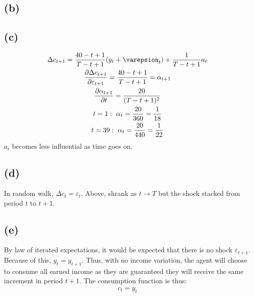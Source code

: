 \documentclass[10pt,a4paper]{article}
\begin{document}
    \subsection*{(b)}
    \subsection*{(c)}
      \begin{gather*}
        \Delta c_{t+1} = \frac{40-t+1}{T-t+1}(y_t+\varepsion_t) + \frac{1}{T-t+1}a_{t} \\
        \frac{\partial\Delta c_{t+1}}{\partial\varepsilon_{t+1}} = \frac{40-t+1}{T-t+1} = \alpha_{t+1} \\
        \frac{\partial\alpha_{t+1}}{\partial t} = \frac{20}{(T-t+1)^2} \\
        t = 1: \ \alpha_t = \frac{20}{360} = \frac{1}{18} \\
        t = 39: \ \alpha_t = \frac{20}{440} = \frac{1}{22} \\
      \end{gather*}
      $a_t$ becomes less influential as time goes on. 
    \subsection*{(d)}
      In random walk, $\Delta c_t = \varepsilon_t$. Above, \alpha shrank as $t \rightarrow T$ but the shock stacked from period $t$ to $t+1$.
    \subsection*{(e)}
      By law of iterated expectations, it would be expected that there is no shock $\varepsilon_{t+1}$. Because of this, $y_t = y_{t+1}$. Thus, with no income variation, the agent will choose to consume all earned income as they are guaranteed they will receive the same increment in period $t+1$. The consumption function is thus:
      \begin{gather*}
        c_t = y_t
      \end{gather*}
\end{document}
